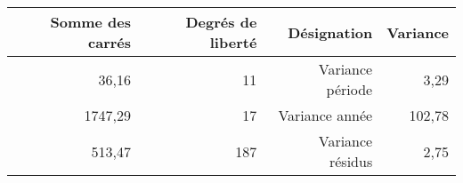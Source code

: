 \begin{tabular}{rrrr}
\toprule
    \textbf{Somme des carrés} & \textbf{Degrés de liberté} & \textbf{Désignation} & \textbf{Variance} \\
\midrule
    36,16 & 11 & Variance période &  3,29 \\ 
    1747,29 & 17  & Variance année & 102,78  \\ 
   513,47  & 187 & Variance résidus &  2,75 \\ 
\bottomrule 
\end{tabular}